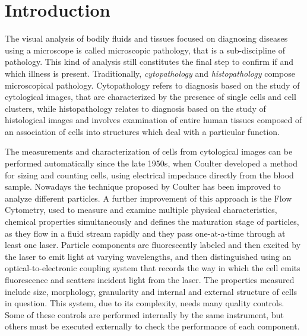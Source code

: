 \chapter{Introduction} \label{chap:global_intro}
The visual analysis of bodily fluids and tissues focused on diagnosing diseases using a microscope is called microscopic pathology, that is a sub-discipline of pathology. This kind of analysis still constitutes the final step to confirm if and which illness is present. Traditionally, \textit{cytopathology} and \textit{histopathology} compose microscopical pathology. Cytopathology refers to diagnosis based on the study of cytological images, that are characterized by the presence of single cells and cell clusters, while histopathology relates to diagnosis based on the study of histological images and involves examination of entire human tissues composed of an association of cells into structures which deal with a particular function.

The measurements and characterization of cells from cytological images can be performed automatically since the late 1950s, when Coulter \cite{Coulter} developed a method for sizing and counting cells, using electrical impedance directly from the blood sample. Nowadays the technique proposed by Coulter has been improved to analyze different particles. A further improvement of this approach is the Flow Cytometry,  used to measure and examine multiple physical characteristics, chemical properties simultaneously and defines the maturation stage of particles, as they flow in a fluid stream rapidly and they pass one-at-a-time through at least one laser. Particle components are fluorescently labeled and then excited by the laser to emit light at varying wavelengths, and then distinguished using an optical-to-electronic coupling system that records the way in which the cell emits fluorescence and scatters incident light from the laser. The properties measured include size, morphology, granularity and internal and external structure of cells in question. This system, due to its complexity, needs many quality controls. Some of these controls are performed internally by the same instrument, but others must be executed externally to check the performance of each component.

